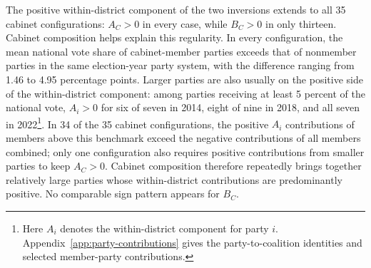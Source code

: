 \documentclass[11pt]{article}
\begin{document}



The positive within-district component of the two inversions extends to all 35
cabinet configurations: \(A_C>0\) in every case, while \(B_C>0\) in only
thirteen. Cabinet composition helps explain this regularity. In every
configuration, the mean national vote share of cabinet-member parties exceeds
that of nonmember parties in the same election-year party system, with the
difference ranging from 1.46 to 4.95 percentage points. Larger parties are also
usually on the positive side of the within-district component: among parties
receiving at least 5 percent of the national vote, \(A_i>0\) for six of seven in
2014, eight of nine in 2018, and all seven in 2022\footnote{
Here \(A_i\) denotes the within-district component for party \(i\).
Appendix~\ref{app:party-contributions} gives the party-to-coalition
identities and selected member-party contributions.}. In 34 of the 35 cabinet
configurations, the positive \(A_i\) contributions of members above this
benchmark exceed the negative contributions of all members combined; only one
configuration also requires positive contributions from smaller parties to keep
\(A_C>0\). Cabinet composition therefore repeatedly brings together relatively
large parties whose within-district contributions are predominantly positive.
No comparable sign pattern appears for \(B_C\).
\end{document}
